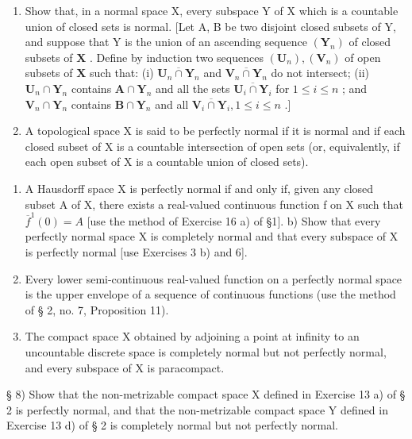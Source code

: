 \begin{enumerate}
\def\labelenumi{\arabic{enumi})}
\setcounter{enumi}{5}
\item
  Show that, in a normal space X, every subspace Y of X which is a countable union of closed sets is normal. {[}Let A, B be two disjoint closed subsets of Y, and suppose that Y is the union of an ascending sequence \((\mathbf{Y}_n)\) of closed subsets of \(\mathbf{X}\) . Define by induction two sequences \((\mathbf{U}_n), (\mathbf{V}_n)\) of open subsets of \(\mathbf{X}\) such that: (i) \(\overline{\mathbf{U}_n \cap \mathbf{Y}_n}\) and \(\overline{\mathbf{V}_n \cap \mathbf{Y}_n}\) do not intersect; (ii) \(\mathbf{U}_n \cap \mathbf{Y}_n\) contains \(\mathbf{A} \cap \mathbf{Y}_n\) and all the sets \(\overline{\mathbf{U}_i \cap \mathbf{Y}_i}\) for \(1 \leqslant i \leqslant n\) ; and \(\mathbf{V}_n \cap \mathbf{Y}_n\) contains \(\mathbf{B} \cap \mathbf{Y}_n\) and all \(\overline{\mathbf{V}_i \cap \mathbf{Y}_i}, 1 \leqslant i \leqslant n\) .{]}
\item
  A topological space X is said to be perfectly normal if it is normal and if each closed subset of X is a countable intersection of open sets (or, equivalently, if each open subset of X is a countable union of closed sets).
\end{enumerate}

\begin{enumerate}
\def\labelenumi{\alph{enumi})}
\item
  A Hausdorff space X is perfectly normal if and only if, given any closed subset A of X, there exists a real-valued continuous function f on X such that \(\overline{f}^{1}(0)=A\) {[}use the method of Exercise 16 a) of §1{]}. b) Show that every perfectly normal space X is completely normal and that every subspace of X is perfectly normal {[}use Exercises 3 b) and 6{]}.
\item
  Every lower semi-continuous real-valued function on a perfectly normal space is the upper envelope of a sequence of continuous functions (use the method of § 2, no. 7, Proposition 11).
\item
  The compact space X obtained by adjoining a point at infinity to an uncountable discrete space is completely normal but not perfectly normal, and every subspace of X is paracompact.
\end{enumerate}

§ 8) Show that the non-metrizable compact space X defined in Exercise 13 a) of § 2 is perfectly normal, and that the non-metrizable compact space Y defined in Exercise 13 d) of § 2 is completely normal but not perfectly normal.


